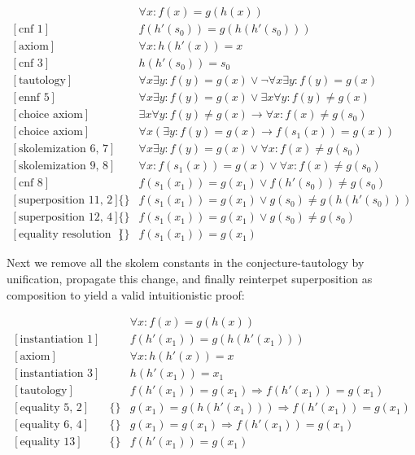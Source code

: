 \documentclass[onehalfspacing]{article}
\begin{document}
\setcounter{equation}{0}
\begin{align}
	[\text{axiom}]&&\forall x: f(x) = g(h(x))\\
	[\text{cnf 1}]&&f(h'(s_0)) = g(h(h'(s_0)))\\
	[\text{axiom}]&&\forall x: h(h'(x)) = x\\
	[\text{cnf 3}]&&h(h'(s_0)) = s_0\\
	[\text{tautology}]&&\forall x\exists y: f(y) = g(x)\vee\neg\forall x\exists y: f(y) = g(x)\\
	[\text{ennf 5}]&&\forall x\exists y: f(y) = g(x)\vee\exists x\forall y: f(y)\neq g(x)\\
	[\text{choice axiom}]&&\exists x\forall y: f(y)\neq g(x)\rightarrow \forall x : f(x) \neq g(s_0)\\
	[\text{choice axiom}]&&\forall x(\exists y: f(y)= g(x)\rightarrow f(s_1(x)) = g(x))\\
	[\text{skolemization 6, 7}]&&\forall x\exists y: f(y) = g(x)\vee\forall x: f(x)\neq g(s_0)\\
	[\text{skolemization 9, 8}]&&\forall x: f(s_1(x)) = g(x)\vee\forall x: f(x)\neq g(s_0)\\
	[\text{cnf 8}]&&f(s_1(x_1)) = g(x_1)\vee f(h'(s_0))\neq g(s_0)\\
	[\text{superposition 11, 2}]&\{\}&f(s_1(x_1)) = g(x_1)\vee g(s_0)\neq g(h(h'(s_0)))\\
	[\text{superposition 12, 4}]&\{\}&f(s_1(x_1)) = g(x_1)\vee g(s_0)\neq g(s_0)\\
	[\text{equality resolution 13}]&\{\}&f(s_1(x_1)) = g(x_1)
\end{align}

Next we remove all the skolem constants in the conjecture-tautology by unification, propagate this change, and finally reinterpet superposition as composition to yield a valid intuitionistic proof:

\setcounter{equation}{0}
\begin{align}
	[\text{axiom}]&&\forall x: f(x) = g(h(x))\\
	[\text{instantiation 1}]&&f(h'(x_1)) = g(h(h'(x_1)))\\
	[\text{axiom}]&&\forall x: h(h'(x)) = x\\
	[\text{instantiation 3}]&&h(h'(x_1)) = x_1\\
	[\text{tautology}]&&f(h'(x_1)) = g(x_1)\Rightarrow f(h'(x_1)) = g(x_1)\\
	[\text{equality 5, 2}]&\{\}&g(x_1)= g(h(h'(x_1)))\Rightarrow f(h'(x_1)) = g(x_1)\\
	[\text{equality 6, 4}]&\{\}&g(x_1)= g(x_1)\Rightarrow f(h'(x_1)) = g(x_1)\\
	[\text{equality 13}]&\{\}&f(h'(x_1)) = g(x_1)
\end{align}
\end{document}
